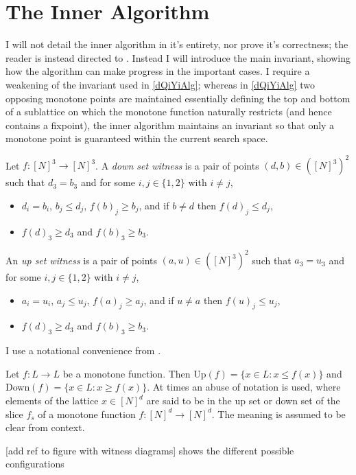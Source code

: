 \section{The Inner Algorithm}
I will not detail the inner algorithm in it's entirety, nor prove it's correctness;
the reader is instead directed to \citep{fasterTarski}. Instead I will introduce
the main invariant, showing how the algorithm can make progress in the important 
cases. I require a weakening of the invariant used in \cref{dQiYiAlg}; whereas
in \cref{dQiYiAlg} two opposing monotone points are maintained essentially
defining the top and bottom of a sublattice on which the monotone function
naturally restricts (and hence contains a fixpoint), 
the inner algorithm maintains an invariant so that only a monotone point is guaranteed
within the current search space.
\begin{definition}
  Let $f : [N]^3 \to [N]^3$. A \emph{down set witness} is a pair of points
  $(d, b) \in ([N]^3)^2$ such that $d_3 = b_3$ and for some $i, j \in \{1, 2\}$
  with $i \neq j$,
  \begin{itemize}
    \item $d_i = b_i$, $b_j \leq d_j$, $f(b)_j \geq b_j$, and if $b \neq d$ then $f(d)_j \leq d_j$,
    \item $f(d)_3 \geq d_3$ and $f(b)_3 \geq b_3$.
  \end{itemize}
  An \emph{up set witness} is a pair of points
  $(a, u) \in ([N]^3)^2$ such that $a_3 = u_3$ and for some $i, j \in \{1, 2\}$
  with $i \neq j$,
  \begin{itemize}
    \item $a_i = u_i$, $a_j \leq u_j$, $f(a)_j \geq a_j$, and if $u \neq a$ then $f(u)_j \leq u_j$,
    \item $f(d)_3 \geq d_3$ and $f(b)_3 \geq b_3$.
  \end{itemize}
\end{definition}
I use a notational convenience from \citep{fasterTarski}.
\begin{notation}
  Let $f : L \to L$ be a monotone function. Then Up$(f) = \{x \in L : x \leq f(x)\}$
  and Down$(f) = \{x \in L : x \geq f(x)\}$. At times an abuse of notation is used,
  where elements of the lattice $x \in [N]^d$ are said to be in the up set or down
  set of the slice $f_s$ of a monotone function $f : [N]^d \to [N]^d$. The meaning
  is assumed to be clear from context.
\end{notation}
[add ref to figure with witness diagrams] shows the different possible configurations
